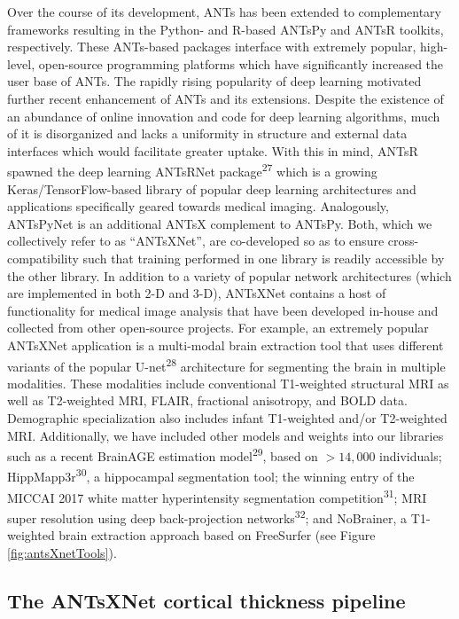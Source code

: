 \documentclass[12pt,]{article}
\begin{document}
Over the course of its development, ANTs has been extended to
complementary frameworks resulting in the Python- and R-based ANTsPy and
ANTsR toolkits, respectively. These ANTs-based packages interface with
extremely popular, high-level, open-source programming platforms which
have significantly increased the user base of ANTs. The rapidly rising
popularity of deep learning motivated further recent enhancement of ANTs
and its extensions. Despite the existence of an abundance of online
innovation and code for deep learning algorithms, much of it is
disorganized and lacks a uniformity in structure and external data
interfaces which would facilitate greater uptake. With this in mind,
ANTsR spawned the deep learning ANTsRNet package\textsuperscript{27}
which is a growing Keras/TensorFlow-based library of popular deep
learning architectures and applications specifically geared towards
medical imaging. Analogously, ANTsPyNet is an additional ANTsX
complement to ANTsPy. Both, which we collectively refer to as
``ANTsXNet'', are co-developed so as to ensure cross-compatibility such
that training performed in one library is readily accessible by the
other library. In addition to a variety of popular network architectures
(which are implemented in both 2-D and 3-D), ANTsXNet contains a host of
functionality for medical image analysis that have been developed
in-house and collected from other open-source projects. For example, an
extremely popular ANTsXNet application is a multi-modal brain extraction
tool that uses different variants of the popular
U-net\textsuperscript{28} architecture for segmenting the brain in
multiple modalities. These modalities include conventional T1-weighted
structural MRI as well as T2-weighted MRI, FLAIR, fractional anisotropy,
and BOLD data. Demographic specialization also includes infant
T1-weighted and/or T2-weighted MRI. Additionally, we have included other
models and weights into our libraries such as a recent BrainAGE
estimation model\textsuperscript{29}, based on \(>14,000\) individuals;
HippMapp3r\textsuperscript{30}, a hippocampal segmentation tool; the
winning entry of the MICCAI 2017 white matter hyperintensity
segmentation competition\textsuperscript{31}; MRI super resolution using
deep back-projection networks\textsuperscript{32}; and NoBrainer, a
T1-weighted brain extraction approach based on FreeSurfer (see Figure
\ref{fig:antsXnetTools}).

\hypertarget{the-antsxnet-cortical-thickness-pipeline}{%
\subsection*{The ANTsXNet cortical thickness
pipeline}\label{the-antsxnet-cortical-thickness-pipeline}}
\end{document}
